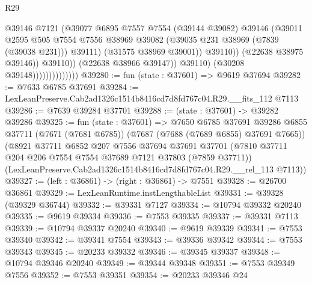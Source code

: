 \begin{lexlean}{R29}
\begin{coremodule}
                                            @39146
                                            @7121
                                            (@39077
                                              @6895
                                              @7557
                                              @7554
                                              (@39144 @39082)
                                              @39146
                                              (@39011
                                                @2595
                                                @505
                                                @7554
                                                @7556
                                                @38969
                                                @39082
                                                (@39035 @231 @38969 (@7839 (@39038 @231)))
                                                @39111)
                                              (@31575 @38969 @39001))
                                            @39110))
                                        (@22638 @38975 @39146))
                                      @39110))
                                  (@22638 @38966 @39147))
                                @39110)
                              (@30208 @39148))))))))))))))
@39280 := fun (state : @37601) => @9619 @37694
@39282 := @7633 @6785 @37691
@39284 := LexLeanPreserve.Cab2ad1326c1514b8416cd7d8fd767c04.R29.__fits_112 @7113
@39286 := @7639 @39284 @37701
@39288 := (state : @37601) -> @39282 @39286
@39325 := fun (state : @37601) =>
  @7650
    @6785
    @37691
    @39286
    @6855
    @37711
    (@7671 (@7681 @6785))
    (@7687 (@7688 (@7689 @6855) @37691 @7665))
    (@8921
      @37711
      @6852
      @207
      @7556
      @37694
      @37691
      @37701
      (@7810 @37711 @204 @206 @7554 @7554 @37689 @7121 @37803 (@7859 @37711))
      (LexLeanPreserve.Cab2ad1326c1514b8416cd7d8fd767c04.R29.__rel_113 @7113))
@39327 := (left : @36861) -> (right : @36861) -> @7551
@39328 := @26700 @36861
@39329 := LexLeanRuntime.instLengthableList
@39331 := @39328 (@39329 @36744)
@39332 := @39331 @7127
@39334 := @10794 @39332 @20240
@39335 := @9619 @39334
@39336 := @7553 @39335
@39337 := @39331 @7113
@39339 := @10794 @39337 @20240
@39340 := @9619 @39339
@39341 := @7553 @39340
@39342 := @39341 @7554
@39343 := @39336 @39342
@39344 := @7553 @39343
@39345 := @20233 @39332
@39346 := @39345 @39337
@39348 := @10794 @39346 @20240
@39349 := @39344 @39348
@39351 := @7553 @39349 @7556
@39352 := @7553 @39351
@39354 := @20233 @39346 @24

\end{coremodule}
\end{lexlean}
